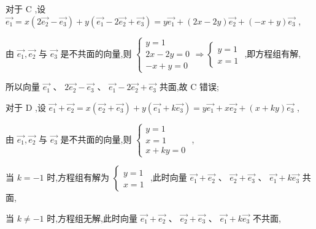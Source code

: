 \documentclass[10pt]{article}
\begin{document}
对于 \(\mathrm{C}\) ,设 \(\overrightarrow{{e}_{1}} = x\left( {2\overrightarrow{{e}_{2}} - \overrightarrow{{e}_{3}}}\right)  + y\left( {\overrightarrow{{e}_{1}} - 2\overrightarrow{{e}_{2}} + \overrightarrow{{e}_{3}}}\right)  = y\overrightarrow{{e}_{1}} + \left( {{2x} - {2y}}\right) \overrightarrow{{e}_{2}} + \left( {-x + y}\right) \overrightarrow{{e}_{3}}\) ,

由 \(\overrightarrow{{e}_{1}},\overrightarrow{{e}_{2}}\) 与 \(\overrightarrow{{e}_{3}}\) 是不共面的向量,则 \(\left\{  {\begin{array}{l} y = 1 \\  {2x} - {2y} = 0 \\   - x + y = 0 \end{array} \Rightarrow  \left\{  \begin{array}{l} y = 1 \\  x = 1 \end{array}\right. }\right.\) ,即方程组有解,

所以向量 \(\overrightarrow{{e}_{1}}\text{ 、 }2\overrightarrow{{e}_{2}} - \overrightarrow{{e}_{3}}\text{ 、 }\overrightarrow{{e}_{1}} - 2\overrightarrow{{e}_{2}} + \overrightarrow{{e}_{3}}\) 共面,故 \(\mathrm{C}\) 错误;

对于 \(\mathrm{D}\) ,设 \(\overrightarrow{{e}_{1}} + \overrightarrow{{e}_{2}} = x\left( {\overrightarrow{{e}_{2}} + \overrightarrow{{e}_{3}}}\right)  + y\left( {\overrightarrow{{e}_{1}} + k\overrightarrow{{e}_{3}}}\right)  = y\overrightarrow{{e}_{1}} + x\overrightarrow{{e}_{2}} + \left( {x + {ky}}\right) \overrightarrow{{e}_{3}}\) ,

由 \(\overrightarrow{{e}_{1}},\overrightarrow{{e}_{2}}\) 与 \(\overrightarrow{{e}_{3}}\) 是不共面的向量,则 \(\left\{  \begin{array}{l} y = 1 \\  x = 1 \\  x + {ky} = 0 \end{array}\right.\) ,

当 \(k =  - 1\) 时,方程组有解为 \(\left\{  \begin{array}{l} y = 1 \\  x = 1 \end{array}\right.\) ,此时向量 \(\overrightarrow{{e}_{1}} + \overrightarrow{{e}_{2}}\text{ 、 }\overrightarrow{{e}_{2}} + \overrightarrow{{e}_{3}}\text{ 、 }\overrightarrow{{e}_{1}} + k\overrightarrow{{e}_{3}}\) 共面,

当 \(k \neq   - 1\) 时,方程组无解,此时向量 \(\overrightarrow{{e}_{1}} + \overrightarrow{{e}_{2}}\text{ 、 }\overrightarrow{{e}_{2}} + \overrightarrow{{e}_{3}}\text{ 、 }\overrightarrow{{e}_{1}} + k\overrightarrow{{e}_{3}}\) 不共面,
\end{document}
